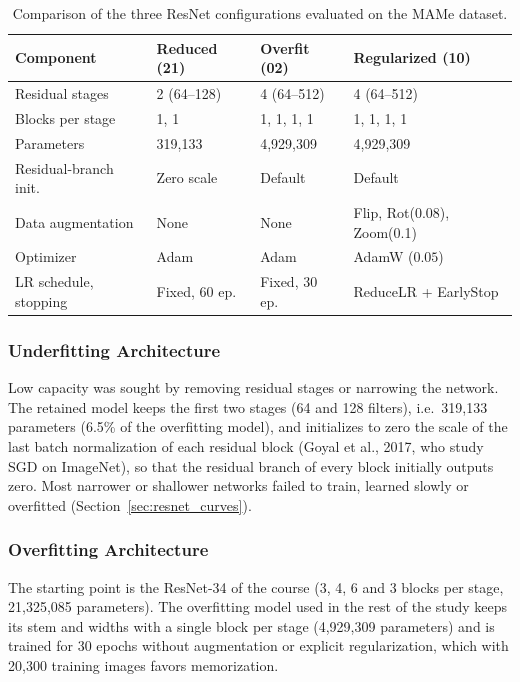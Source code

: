 \documentclass[11pt, a4paper]{article}
\begin{document}
\begin{table}[htbp]
\centering
\caption{Comparison of the three ResNet configurations evaluated on the MAMe dataset.}
\label{tab:resnet_architectures}
\small
\begin{tabular}{@{}llll@{}}
\toprule
\textbf{Component} & \textbf{Reduced (21)} & \textbf{Overfit (02)} & \textbf{Regularized (10)} \\
\midrule
Residual stages & 2 (64--128) & 4 (64--512) & 4 (64--512) \\
Blocks per stage & 1, 1 & 1, 1, 1, 1 & 1, 1, 1, 1 \\
Parameters & 319,133 & 4,929,309 & 4,929,309 \\
Residual-branch init. & Zero scale & Default & Default \\
Data augmentation & None & None & Flip, Rot(0.08), Zoom(0.1) \\
Optimizer & Adam & Adam & AdamW ($0.05$) \\
LR schedule, stopping & Fixed, 60 ep. & Fixed, 30 ep. & ReduceLR + EarlyStop \\
\bottomrule
\end{tabular}
\end{table}

\subsubsection{Underfitting Architecture}
Low capacity was sought by removing residual stages or narrowing the network. The retained model keeps the first two stages (64 and 128 filters), i.e.\ 319,133 parameters (6.5\% of the overfitting model), and initializes to zero the scale of the last batch normalization of each residual block (Goyal et al., 2017, who study SGD on ImageNet), so that the residual branch of every block initially outputs zero. Most narrower or shallower networks failed to train, learned slowly or overfitted (Section~\ref{sec:resnet_curves}).

\subsubsection{Overfitting Architecture}
The starting point is the ResNet-34 of the course (3, 4, 6 and 3 blocks per stage, 21,325,085 parameters). The overfitting model used in the rest of the study keeps its stem and widths with a single block per stage (4,929,309 parameters) and is trained for 30 epochs without augmentation or explicit regularization, which with 20,300 training images favors memorization.
\end{document}
